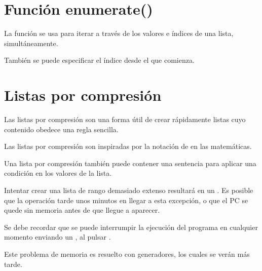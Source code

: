 
\section{Función enumerate()}

La función  se usa para iterar a través de los valores e índices de una lista, simultáneamente.


También se puede especificar el índice desde el que comienza.


\section{Listas por compresión}

Las listas por compresión son una forma útil de crear rápidamente listas cuyo contenido obedece una regla sencilla.


Las listas por compresión son inspiradas por la notación de  en las matemáticas.

Una lista por compresión también puede contener una sentencia  para aplicar una condición en los valores de la lista.


Intentar crear una lista de rango demasiado extenso resultará en un .
Es posible que la operación tarde unos minutos en llegar a esta excepción, o que el PC se quede sin memoria antes de que llegue a aparecer.


Se debe recordar que se puede interrumpir la ejecución del programa en cualquier momento enviando un , al pulsar .

Este problema de memoria es resuelto con generadores, los cuales se verán más tarde.

\clearpage